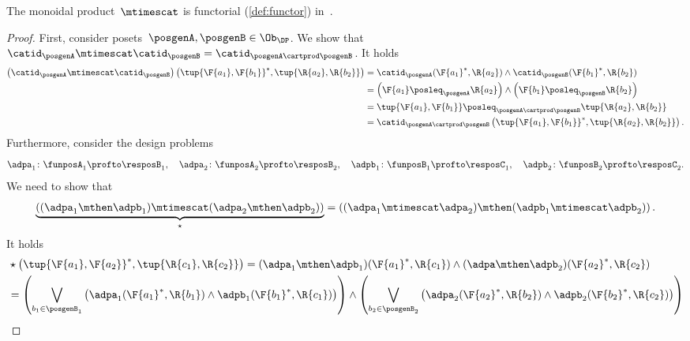 \begin{lemma}
    \label{lem:monoidal_functorial}
    The monoidal product~$\mtimescat$ is functorial (\cref{def:functor}) in~\DP.
\end{lemma}
\begin{proof}
    First, consider posets~$\posgenA,\posgenB\in \Ob_\DP$. We show that~$\catid_\posgenA\mtimescat \catid_\posgenB = \catid_{\posgenA\cartprod \posgenB}$. It holds
    \begin{equation}
        \begin{aligned}
            \left( \catid_{\posgenA}\mtimescat \catid_{\posgenB}\right)
            \left( \tup{\F{a_1},\F{b_1}}^*,\tup{\R{a_2},\R{b_2}}\right)&=
            \catid_\posgenA(\F{a_1}^*,\R{a_2})\wedge \catid_\posgenB(\F{b_1}^*,\R{b_2})\\
            &=\left( \F{a_1}\posleq_\posgenA \R{a_2}\right)\wedge \left( \F{b_1}\posleq_\posgenB \R{b_2}\right)\\
            &=\tup{\F{a_1},\F{b_1}}\posleq_{\posgenA\cartprod \posgenB}\tup{\R{a_2},\R{b_2}}\\
            &=\catid_{\posgenA\cartprod \posgenB}\left( \tup{\F{a_1},\F{b_1}}^*,\tup{\R{a_2},\R{b_2}}\right).
        \end{aligned}
    \end{equation}
    Furthermore, consider the design problems
    \begin{equation*}
        \adpa_1\colon \funposA_1 \profto \resposB_1,\quad \adpa_2\colon \funposA_2\profto \resposB_2, \quad \adpb_1\colon \funposB_1\profto \resposC_1,\quad \adpb_2\colon \funposB_2\profto \resposC_2.
    \end{equation*}
    We need to show that
    \begin{equation}
        \underbrace{\left( (\adpa_1\mthen \adpb_1) \mtimescat (\adpa_2\mthen \adpb_2)\right)}_{\star}=\left( (\adpa_1\mtimescat \adpa_2)\mthen (\adpb_1\mtimescat \adpb_2)\right).
    \end{equation}
    It holds
    \begin{equation}
        \begin{aligned}
            &\star \left( \tup{\F{a_1},\F{a_2}}^*,\tup{\R{c_1},\R{c_2}}\right)=(\adpa_1\mthen \adpb_1)(\F{a_1}^*,\R{c_1})\wedge (\adpa\mthen \adpb_2)(\F{a_2}^*,\R{c_2})\\
            &=\left(\bigvee_{b_1\in \posgenB_1}\left( \adpa_1(\F{a_1}^*,\R{b_1})\wedge \adpb_1(\F{b_1}^*,\R{c_1})\right)\right) \wedge\left(\bigvee_{b_2\in \posgenB_2}\left( \adpa_2(\F{a_2}^*,\R{b_2})\wedge \adpb_2(\F{b_2}^*,\R{c_2})\right)\right)\\

\end{aligned}
\end{equation}
\end{proof}
